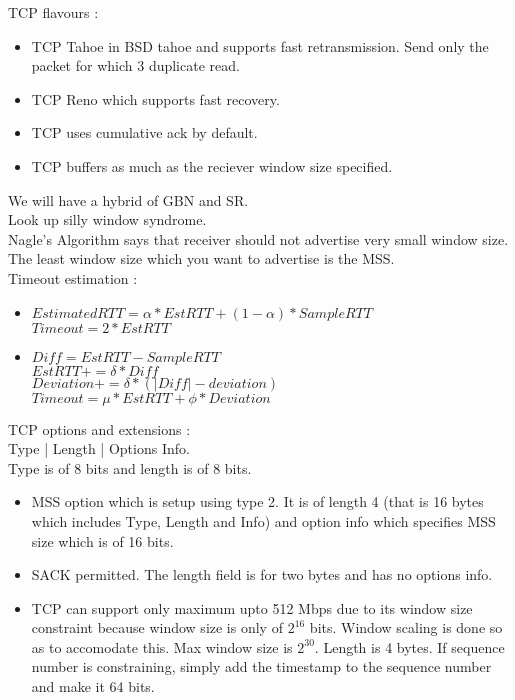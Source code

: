\documentclass[solution,addpoints,12pt]{exam}
\begin{document}
TCP flavours :\\
\begin{itemize}
\item TCP Tahoe in BSD tahoe and supports fast retransmission.
Send only the packet for which 3 duplicate read.
\item TCP Reno which supports fast recovery.
\item TCP uses cumulative ack by default.
\item TCP buffers as much as the reciever window size specified.
\end{itemize}
We will have a hybrid of GBN and SR.\\
Look up silly window syndrome.\\
Nagle's Algorithm says that receiver should not advertise very small window
size. The least window size which you want to advertise is the MSS.\\
Timeout estimation :\\
\begin{itemize}
\item $Estimated RTT = \alpha*EstRTT + (1-\alpha)*SampleRTT$\\
$Timeout = 2*EstRTT$
\item
$Diff = EstRTT - SampleRTT$\\
$EstRTT += \delta*Diff$\\
$Deviation += \delta*(|Diff|-deviation)$\\
$Timeout = \mu*EstRTT + \phi*Deviation$
\end{itemize}

TCP options and extensions :\\
Type | Length | Options Info.\\
Type is of 8 bits and length is of 8 bits.
\begin{itemize}
\item MSS option which is setup using type 2. It is of length 4
(that is 16 bytes which includes Type, Length and Info) and option info which
specifies MSS size which is of 16 bits.
\item SACK permitted. The length field is for two bytes and has no
options info.
\item
TCP can support only maximum upto 512 Mbps due to its
window size constraint because window size is only of $2^{16}$ bits.
Window scaling is done so as to accomodate this. Max window size
is $2^{30}$. Length is 4 bytes. If sequence number is constraining,
simply add the timestamp to the sequence number and make it 64 bits.\\
\end{itemize}
\end{document}
